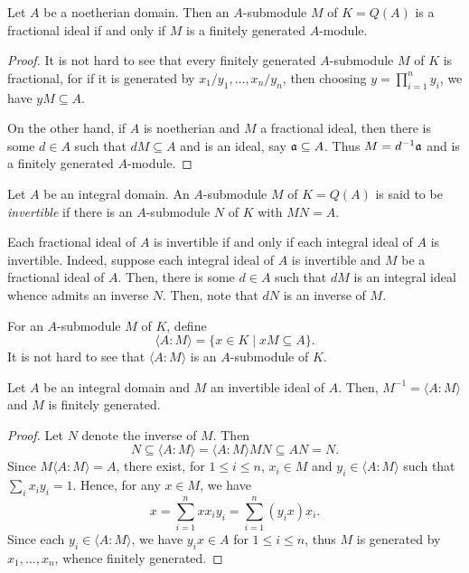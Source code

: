 \begin{proposition}
    Let $A$ be a noetherian domain. Then an $A$-submodule $M$ of $K = Q(A)$ is a fractional ideal if and only if $M$ is a finitely generated $A$-module.
\end{proposition}
\begin{proof}
    It is not hard to see that every finitely generated $A$-submodule $M$ of $K$ is fractional, for if it is generated by $x_1/y_1,\ldots,x_n/y_n$, then choosing $y = \prod_{i = 1}^n y_i$, we have $yM\subseteq A$.

    On the other hand, if $A$ is noetherian and $M$ a fractional ideal, then there is some $d\in A$ such that $dM\subseteq A$ and is an ideal, say $\mathfrak a\subseteq A$. Thus $M = d^{-1}\mathfrak a$ and is a finitely generated $A$-module.
\end{proof}

\begin{definition}
    Let $A$ be an integral domain. An $A$-submodule $M$ of $K = Q(A)$ is said to be \emph{invertible} if there is an $A$-submodule $N$ of $K$ with $MN = A$. 
\end{definition}

\begin{remark}
    Each fractional ideal of $A$ is invertible if and only if each integral ideal of $A$ is invertible. Indeed, suppose each integral ideal of $A$ is invertible and $M$ be a fractional ideal of $A$. Then, there is some $d\in A$ such that $dM$ is an integral ideal whence admits an inverse $N$. Then, note that $dN$ is an inverse of $M$.
\end{remark}

For an $A$-submodule $M$ of $K$, define
\begin{equation*}
    \langle A:M\rangle = \{x\in K\mid xM\subseteq A\}.
\end{equation*}
It is not hard to see that $\langle A:M\rangle$ is an $A$-submodule of $K$.

\begin{proposition}
    Let $A$ be an integral domain and $M$ an invertible ideal of $A$. Then, $M^{-1} = \langle A:M\rangle$ and $M$ is finitely generated.
\end{proposition}
\begin{proof}
    Let $N$ denote the inverse of $M$. Then 
    \begin{equation*}
        N\subseteq\langle A:M\rangle = \langle A:M\rangle MN\subseteq AN = N.
    \end{equation*}
    Since $M\langle A:M\rangle = A$, there exist, for $1\le i\le n$, $x_i\in M$ and $y_i\in\langle A:M\rangle$ such that $\sum_{i}x_iy_i = 1$. Hence, for any $x\in M$, we have 
    \begin{equation*}
        x = \sum_{i = 1}^n xx_iy_i = \sum_{i = 1}^n(y_ix)x_i.
    \end{equation*}
    Since each $y_i\in\langle A:M\rangle$, we have $y_ix\in A$ for $1\le i\le n$, thus $M$ is generated by $x_1,\ldots,x_n$, whence finitely generated.
\end{proof}


